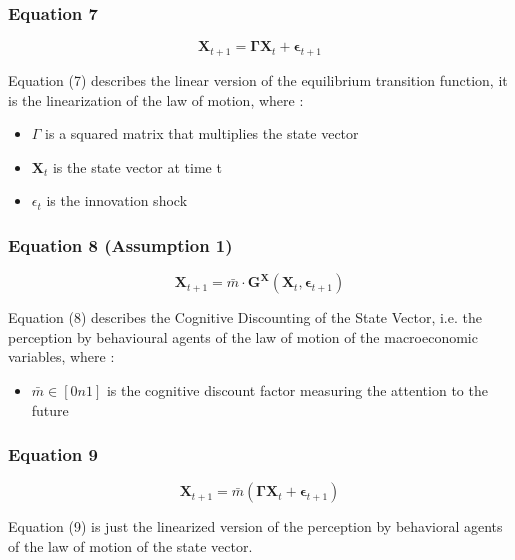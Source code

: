 \documentclass{article}
\begin{document}
\subsubsection*{Equation 7}

\begin{equation}
    \bm{X}_{t+1}=\bm{\Gamma}\bm{X}_{t}+\bm{\epsilon}_{t+1}
\end{equation}

Equation (7) describes the linear version of the equilibrium transition function, it is the linearization of the law of motion, where :
\begin{itemize}
    \item $\Gamma$ is a squared matrix that multiplies the state vector
    \item $\bm{X}_t$ is the state vector at time t
    \item $\epsilon_{t}$ is the innovation shock
\end{itemize}

\subsubsection*{Equation 8 (Assumption 1)}

\begin{equation}
    \bm{X}_{t+1}=\bar{m}\cdot\bm{G}^{\bm{X}}(\bm{X}_{t},\bm{\epsilon}_{t+1})
\end{equation}

Equation (8) describes the Cognitive Discounting of the State Vector, i.e. the perception by behavioural agents of the law of motion of the macroeconomic variables, where : 
\begin{itemize}
    \item $\bar{m}\in\left[0n1\right]$ is the cognitive discount factor measuring the attention to the future
\end{itemize}

\subsubsection*{Equation 9}

\begin{equation}
    \bm{X}_{t+1}=\bar{m}(\bm{\Gamma}\bm{X}_{t}+\bm{\epsilon}_{t+1})
\end{equation}

Equation (9) is just the linearized version of the perception by behavioral agents of the law of motion of the state vector. 
\end{document}
